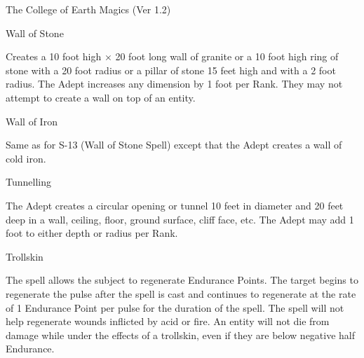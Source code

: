 \begin{Chapter}{The College of Earth Magics (Ver 1.2)}
\begin{spell}[S-13]{Wall of Stone}
\begin{effects}
Creates a 10 foot high × 20 foot long wall of granite or a 10 foot
high ring of stone with a 20 foot radius or a pillar of stone 15 feet
high and with a 2 foot radius. The Adept increases any dimension by 1
foot per Rank. They may not attempt to create a wall on top of an
entity.
\end{effects}
\end{spell}

\begin{spell}[S-14]{Wall of Iron}

\begin{effects}
Same as for S-13 (Wall of Stone Spell) except that the Adept creates a
wall of cold iron.
\end{effects}
\end{spell}

\begin{spell}[S-15]{Tunnelling}

\begin{effects}
The Adept creates a circular opening or tunnel 10 feet in diameter and
20 feet deep in a wall, ceiling, floor, ground surface, cliff face,
etc.  The Adept may add 1 foot to either depth or radius per Rank.
\end{effects}
\end{spell}

\begin{spell}[S-16]{Trollskin}

\begin{effects}
The spell allows the subject to regenerate Endurance Points.  The
target begins to regenerate the pulse after the spell is cast and
continues to regenerate at the rate of 1 Endurance Point per pulse for
the duration of the spell.  The spell will not help regenerate wounds
inflicted by acid or fire.  An entity will not die from damage while
under the effects of a trollskin, even if they are below negative half
Endurance.
\end{effects}
\end{spell}


\end{Chapter}
